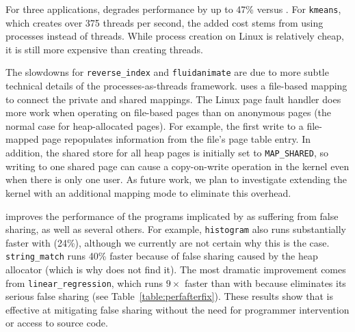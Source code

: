 
For three applications, \sheriffprotect{} degrades performance by up
to 47\% versus \pthreads{}. For \texttt{kmeans}, which creates over 375
threads per second, the added cost stems from using processes instead
of threads. While process creation on Linux is relatively cheap, it is
still more expensive than creating threads.

The slowdowns for \texttt{reverse\_index} and \texttt{fluidanimate}
are due to more subtle technical details of the processes-as-threads
framework. \sheriff{} uses a file-based mapping to connect the private
and shared mappings. The Linux page fault handler does more work when
operating on file-based pages than on anonymous pages (the normal case
for heap-allocated pages). For example, the first write to a
file-mapped page repopulates information from the file's page table
entry. In addition, the shared store for all heap pages is initially
set to \texttt{MAP\_SHARED}, so writing to one shared page can cause a
copy-on-write operation in the kernel even when there is only one
user. As future work, we plan to investigate extending the kernel with an
additional mapping mode to eliminate this overhead.

\sheriffprotect{} improves the performance of the programs implicated
by \sheriffdetect{} as suffering from false sharing, as well as several
others. For example, \texttt{histogram} also runs substantially faster
with \sheriffprotect{} (24\%), although we currently are not certain
why this is the case.
\texttt{string\_match} runs 40\% faster because of false sharing
caused by the \pthreads{} heap allocator (which is why
\sheriffdetect{} does not find it). The most dramatic
improvement comes from
\texttt{linear\_regression}, which runs $9\times$ faster than with
\pthreads{} because \sheriffprotect{} eliminates its serious false
sharing (see Table~\ref{table:perfafterfix}).  These results
show that \sheriffprotect{} is effective at mitigating false sharing
without the need for programmer intervention or access to source code.
